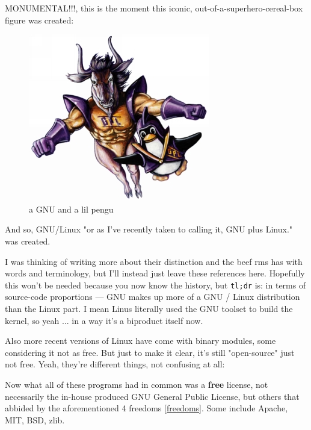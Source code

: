 \documentclass[sigplan,screen]{acmart}
\begin{document}
MONUMENTAL!!!, this is the moment this iconic, out-of-a-superhero-cereal-box figure was created:
\begin{figure}[H]
	\centering
	\includegraphics[width=\columnwidth]{pics/gnu-and-penguin.jpg}
	\caption{a GNU and a lil pengu}
	\label{fig:gnu-linux}
\end{figure}
And so, GNU/Linux "or as I've recently taken to calling it, GNU plus Linux." \cite{gnu-and-linux} was created.

I was thinking of writing more about their distinction and the beef rms has with words and terminology, but I'll instead just leave these references here. \cite{gnu-vs-linux-1} \cite{gnu-vs-linux-2} \cite{gnu-vs-linux-3} Hopefully this won't be needed because you now know the history, but \verb|tl;dr| is: in terms of source-code proportions — GNU makes up more of a GNU / Linux distribution than the Linux part. I mean Linus literally used the GNU toolset to build the kernel, so yeah ... in a way it's a biproduct itself now.

Also more recent versions of Linux have come with binary modules, some considering it not as free. But just to make it clear, it's still "open-source" just not free. Yeah, they're different things, not confusing at all: \cite{free-vs-open-source}

Now what all of these programs had in common was a \textbf{free} license, not necessarily the in-house produced GNU General Public License, but others that abbided by the aforementioned 4 freedoms \ref{freedoms}. Some include Apache, MIT, BSD, zlib.
\end{document}
